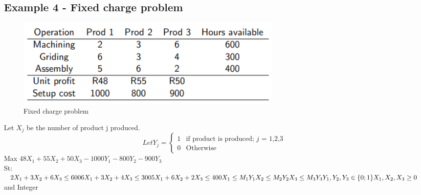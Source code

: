 \documentclass[12pt, a4paper]{article}
\begin{document}
\subsection*{Example 4 - Fixed charge problem}
\begin{figure}[ht]
    \centering
    \includegraphics*[width=0.65\textwidth]{example4}
    \caption{Fixed charge problem}
    \label{fig: Fixed charge problem}
\end{figure}
Let $X_j$ be the  number of product j produced.
\begin{equation}
   Let Y_j =
  \begin{cases}
    1 & \text{if product is produced; $j$ = 1,2,3} \\
    0 & \text{Otherwise}
  \end{cases}
\end{equation}
Max 48$X_1+55X_2+50X_3-1000Y_1-800Y_2-900Y_3$\\
St:\\
$
2X_1+3X_2+6X_3 \leq 600\\
6X_1+3X_2+4X_3 \leq 300\\
5X_1+6X_2+2X_3 \leq 400\\
X_1 \leq M_1Y_1\\
X_2 \leq M_2Y_2\\
X_3 \leq M_3Y_3\\
Y_1,Y_2,Y_3 \in \{0;1\}\\
X_1,X_2,X_3 \geq 0 $ and Integer
\end{document}
